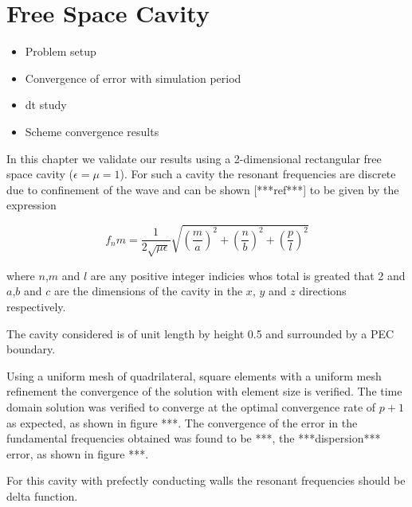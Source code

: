\chapter{Free Space Cavity} %
\label{Chapter3}

\begin{itemize}
	\item Problem setup
  \item Convergence of error with simulation period
  \item dt study
  \item Scheme convergence results
\end{itemize}

In this chapter we validate our results using a 2-dimensional rectangular free space cavity ($\epsilon=\mu=1$). For such a cavity the resonant frequencies are discrete due to confinement of the wave and can be shown [***ref***] to be given by the expression

$$
f_nm = \frac{1}{2 \sqrt{\mu \epsilon}}\sqrt{ ( \frac{m}{a}) ^ 2 +  ( \frac{n}{b}) ^ 2 +  ( \frac{p}{l}) ^ 2 }
$$

where $n$,$m$ and $l$ are any positive integer indicies whos total is greated that 2 and $a$,$b$ and $c$ are the dimensions of the cavity in the $x$, $y$ and $z$ directions respectively.

The cavity considered is of unit length by height 0.5 %
and surrounded by a PEC boundary.

Using a uniform mesh of quadrilateral, square elements with a uniform mesh refinement the convergence of the solution with element size is verified. The time domain solution was verified to converge at the optimal convergence rate of $p + 1$ as expected, as shown in figure ***. The convergence of the error in the fundamental frequencies obtained was found to be ***, the ***dispersion*** error, as shown in figure ***.

For this cavity with prefectly conducting walls the resonant frequencies should be delta function.
